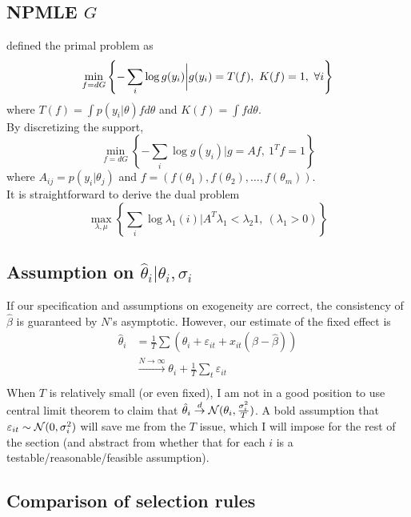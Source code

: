\documentclass[12pt]{article}
\begin{document}
\subsection{NPMLE $G$}
\citet{koenker2014convex} defined the primal problem as
\begin{equation*}
    \min_{f=dG}\left\{-\sum_i \log g(y_i)\bigg |g(y_i) = T(f),\ K(f)=1,\ \forall i \right\}
\end{equation*}
where $ T(f)=\int p(y_i |\theta)fd\theta $ and  $K(f)= \int f d\theta$.\\
By discretizing the support,
\begin{equation*}
    \min_{f=dG}\left\{-\sum_i \log g(y_i)\bigg |g=Af,\ {1^T}f=1\right\}
\end{equation*}
where $A_{ij}= p(y_i|\theta_j) $ and $ f = (f(\theta_1),f(\theta_2),\ldots,f(\theta_m))$.\\
It is straightforward to derive the dual problem
\begin{equation*}
    \max_{\lambda,\mu} \left\{ \sum_i \log \lambda_1(i) \bigg| A^T\lambda_1 < \lambda_2 1,\ (\lambda_1>0) \right\}
\end{equation*}

\subsection{Assumption on $\hat{\theta}_i|\theta_i,\sigma_i$}
If our specification and assumptions on exogeneity are correct, the consistency
of $\hat{\beta}$ is guaranteed by $N$'s asymptotic. However, our estimate of
the fixed effect is
\begin{align*}
    \hat{\theta}_i & =\frac{1}{T}\sum(\theta_i+\varepsilon_{it}+x_{it}(\beta-\hat{\beta}))              \\
                   & \overset{N\to \infty}{\longrightarrow} \theta_i+\frac{1}{T}\sum_t \varepsilon_{it} \\
\end{align*}
When $T$ is relatively small (or even fixed), I am not in a good position to use central limit theorem to claim that $\hat{\theta}_i \overset{d}{\to} \mathcal{N}(\theta_i,\frac{\sigma_i^2}{T})$. A bold assumption that $\varepsilon_{it} \sim \mathcal{N}(0,\sigma_i^2)$ will save me from the $T$ issue, which I will impose for the rest of the section (and abstract from whether that  for each $i$ is a testable/reasonable/feasible assumption).

\subsection{Comparison of selection rules}
\end{document}
